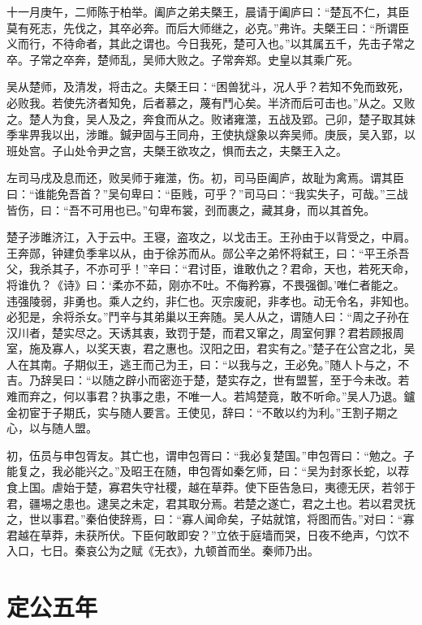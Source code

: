 \documentclass[a4paper,12pt,UTF8,twoside]{ctexbook}
\begin{document}
十一月庚午，二师陈于柏举。阖庐之弟夫槩王，晨请于阖庐曰：“楚瓦不仁，其臣莫有死志，先伐之，其卒必奔。而后大师继之，必克。”弗许。夫槩王曰：“所谓臣义而行，不待命者，其此之谓也。今日我死，楚可入也。”以其属五千，先击子常之卒。子常之卒奔，楚师乱，吴师大败之。子常奔郑。史皇以其乘广死。

吴从楚师，及清发，将击之。夫槩王曰：“困兽犹斗，况人乎？若知不免而致死，必败我。若使先济者知免，后者慕之，蔑有鬥心矣。半济而后可击也。”从之。又败之。楚人为食，吴人及之，奔食而从之。败诸雍澨，五战及郢。己卯，楚子取其妹季芈畀我以出，涉雎。鍼尹固与王同舟，王使执燧象以奔吴师。庚辰，吴入郢，以班处宫。子山处令尹之宫，夫槩王欲攻之，惧而去之，夫槩王入之。

左司马戌及息而还，败吴师于雍澨，伤。初，司马臣阖庐，故耻为禽焉。谓其臣曰：“谁能免吾首？”吴句卑曰：“臣贱，可乎？”司马曰：“我实失子，可哉。”三战皆伤，曰：“吾不可用也已。”句卑布裳，刭而裹之，藏其身，而以其首免。

楚子涉雎济江，入于云中。王寝，盗攻之，以戈击王。王孙由于以背受之，中肩。王奔郧，钟建负季芈以从，由于徐苏而从。郧公辛之弟怀将弑王，曰：“平王杀吾父，我杀其子，不亦可乎！”辛曰：“君讨臣，谁敢仇之？君命，天也，若死天命，将谁仇？《诗》曰：‘柔亦不茹，刚亦不吐。不侮矜寡，不畏强御。’唯仁者能之。违强陵弱，非勇也。乘人之约，非仁也。灭宗废祀，非孝也。动无令名，非知也。必犯是，余将杀女。”鬥辛与其弟巢以王奔随。吴人从之，谓随人曰：“周之子孙在汉川者，楚实尽之。天诱其衷，致罚于楚，而君又窜之，周室何罪？君若顾报周室，施及寡人，以奖天衷，君之惠也。汉阳之田，君实有之。”楚子在公宫之北，吴人在其南。子期似王，逃王而己为王，曰：“以我与之，王必免。”随人卜与之，不吉。乃辞吴曰：“以随之辟小而密迩于楚，楚实存之，世有盟誓，至于今未改。若难而弃之，何以事君？执事之患，不唯一人。若鸠楚竟，敢不听命。”吴人乃退。鑪金初宦于子期氏，实与随人要言。王使见，辞曰：“不敢以约为利。”王割子期之心，以与随人盟。

初，伍员与申包胥友。其亡也，谓申包胥曰：“我必复楚国。”申包胥曰：“勉之。子能复之，我必能兴之。”及昭王在随，申包胥如秦乞师，曰：“吴为封豕长蛇，以荐食上国。虐始于楚，寡君失守社稷，越在草莽。使下臣告急曰，夷德无厌，若邻于君，疆埸之患也。逮吴之未定，君其取分焉。若楚之遂亡，君之土也。若以君灵抚之，世以事君。”秦伯使辞焉，曰：“寡人闻命矣，子姑就馆，将图而告。”对曰：“寡君越在草莽，未获所伏。下臣何敢即安？”立依于庭墙而哭，日夜不绝声，勺饮不入口，七日。秦哀公为之赋《无衣》，九顿首而坐。秦师乃出。


\section{定公五年}
\end{document}
